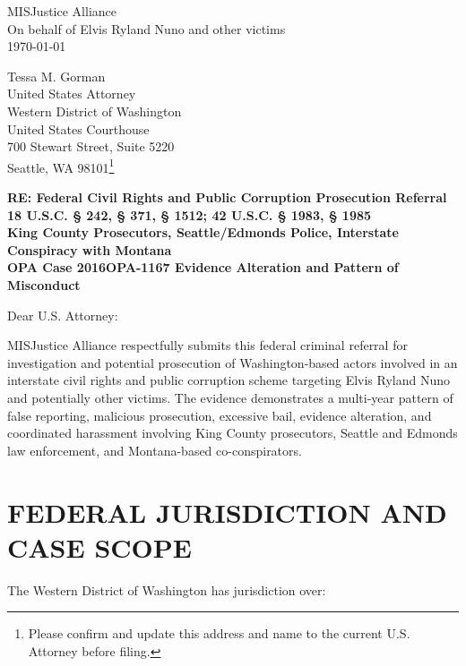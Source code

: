 \documentclass[12pt,oneside]{article}
\begin{document}
\begin{flushleft}

MISJustice Alliance \\
On behalf of Elvis Ryland Nuno and other victims \\
\today

\vspace{0.3in}

Tessa M. Gorman \\
United States Attorney \\
Western District of Washington \\
United States Courthouse \\
700 Stewart Street, Suite 5220 \\
Seattle, WA 98101\footnote{Please confirm and update this address and name to the current U.S. Attorney before filing.}

\vspace{0.3in}

\textbf{RE: Federal Civil Rights and Public Corruption Prosecution Referral} \\
\textbf{18 U.S.C. § 242, § 371, § 1512; 42 U.S.C. § 1983, § 1985} \\
\textbf{King County Prosecutors, Seattle/Edmonds Police, Interstate Conspiracy with Montana} \\
\textbf{OPA Case 2016OPA-1167 Evidence Alteration and Pattern of Misconduct}

\vspace{0.3in}

Dear U.S. Attorney:

\vspace{0.2in}

MISJustice Alliance respectfully submits this federal criminal referral for investigation and potential prosecution of Washington-based actors involved in an interstate civil rights and public corruption scheme targeting Elvis Ryland Nuno and potentially other victims. The evidence demonstrates a multi-year pattern of false reporting, malicious prosecution, excessive bail, evidence alteration, and coordinated harassment involving King County prosecutors, Seattle and Edmonds law enforcement, and Montana-based co-conspirators.

\section*{FEDERAL JURISDICTION AND CASE SCOPE}

The Western District of Washington has jurisdiction over:


\end{flushleft}
\end{document}
